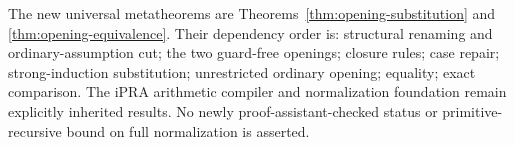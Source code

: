 The new universal metatheorems are
Theorems~\ref{thm:opening-substitution} and
\ref{thm:opening-equivalence}. Their dependency order is: structural
renaming and ordinary-assumption cut; the two guard-free openings;
closure rules; case repair; strong-induction substitution; unrestricted
ordinary opening; equality; exact comparison. The iPRA arithmetic
compiler and normalization foundation remain explicitly inherited
results. No newly proof-assistant-checked status or primitive-recursive
bound on full normalization is asserted.
